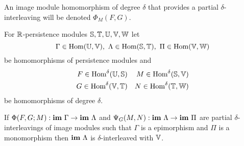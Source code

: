 An image module homomorphism of degree $\delta$ that provides a partial $\delta$-interleaving will be denoted $\Phi_M(F, G)$.

\begin{theorem}\label{thm:interleaving_main}
  For $\mathbb{R}$-persistence modules $\mathbb{S}, \mathbb{T}, \mathbb{U}, \mathbb{V}, \mathbb{W}$ let
  \[ \Gamma\in\Hom(\U,\V),\ \Lambda\in\Hom(\S, \T),\ \Pi\in\Hom(\V,\W)\]
  be homomorphisms of persistence modules and
  \begin{align*}
    F\in\text{Hom}^\delta(\mathbb{U},\mathbb{S})& & M\in\text{Hom}^\delta(\mathbb{S},\mathbb{V})\\
    G\in\text{Hom}^\delta(\mathbb{V},\mathbb{T})& & N\in\text{Hom}^\delta(\mathbb{T},\mathbb{W})
  \end{align*}
  be homomorphisms of degree $\delta$.

  If $\Phi(F, G; M) :\mathbf{im}~\Gamma\to\mathbf{im}~\Lambda$ and $\Psi_G(M, N): \mathbf{im}~\Lambda\to\mathbf{im}~\Pi$ are partial $\delta$-interleavings of image modules such that $\Gamma$ is a epimorphism and $\Pi$ is a monomorphism then $\mathbf{im}~\Lambda$ is $\delta$-interleaved with $\mathbb{V}$.
\end{theorem}
